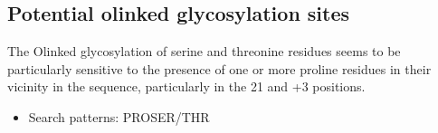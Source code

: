 \documentclass[letterpaper,10pt,english]{jupyterBook}
\begin{document}
\subsection{Potential o\sphinxhyphen{}linked glycosylation sites}
\label{\detokenize{ipynb/chapter1:potential-o-linked-glycosylation-sites}}
\sphinxAtStartPar
The O\sphinxhyphen{}linked glycosylation of serine and threonine residues seems to be particularly sensitive to the presence of one or more proline residues in their vicinity in the sequence, particularly in the 2\sphinxhyphen{}1 and +3 positions.
\begin{itemize}
\item {} 
\sphinxAtStartPar
Search patterns: PRO\sphinxhyphen{}SER/THR

\end{itemize}
\end{document}
